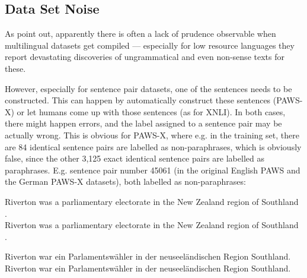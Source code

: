


\subsection{Data Set Noise}
\label{sec:label-noise}

As \citep{caswell2021quality} point out, apparently there is often a lack of
prudence observable when multilingual datasets get compiled --- especially for
low resource languages they report devastating discoveries of ungrammatical
and even non-sense texts for these.


However, especially for sentence pair datasets, one of the sentences needs to be constructed. This
can happen by automatically construct these sentences (PAWS-X) or let humans come up with those
sentences (as for XNLI). In both cases, there might happen errors, and the label assigned to a
sentence pair may be actually wrong. This is obvious for PAWS-X, where e.g. in the training set,
there are 84 identical sentence pairs are labelled as non-paraphrases, which is obviously false,
since the other 3,125 exact identical sentence pairs are labelled as paraphrases. E.g. sentence pair
number 45061 (in the original English PAWS and the German PAWS-X datasets), both labelled as
non-paraphrases:

\begin{examples}
  \item Riverton was a parliamentary electorate in the New Zealand region of Southland .\\
        Riverton was a parliamentary electorate in the New Zealand region of Southland .

  \item Riverton war ein Parlamentswähler in der neuseeländischen Region Southland.\\
        Riverton war ein Parlamentswähler in der neuseeländischen Region Southland.
\end{examples}

